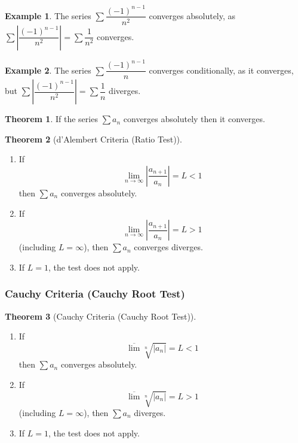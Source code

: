 \documentclass[fleqn, a4paper, 12pt, twoside]{article}
\theoremstyle{definition}
\newtheorem{example}{Example}
\theoremstyle{theorem}
\newtheorem{theorem}{Theorem}
\begin{document}
{\begin{example}
	The series $\sum \dfrac{(-1)^{n - 1}}{n^2}$ converges absolutely, as $\sum \left| \dfrac{(-1)^{n - 1}}{n^2} \right| = \sum \dfrac{1}{n^2}$ converges.
\end{example}

\begin{example}
	The series $\sum \dfrac{(-1)^{n - 1}}{n}$ converges conditionally, as it converges, but $\sum \left| \dfrac{(-1)^{n - 1}}{n^2} \right| = \sum \dfrac{1}{n}$ diverges.
\end{example}

\begin{theorem}
	If the series $\sum a_n$ converges absolutely then it converges.
\end{theorem}

\begin{theorem}[d'Alembert Criteria (Ratio Test)]
	\begin{enumerate}
		\item 
			If 
			\begin{equation*}
				\lim\limits_{n \to \infty} \left| \dfrac{a_{n + 1}}{a_n} \right| = L < 1
			\end{equation*}
			then $\sum a_n$ converges absolutely.
		\item 
			If 
			\begin{equation*}
				\lim\limits_{n \to \infty} \left| \dfrac{a_{n + 1}}{a_n} \right| = L > 1
			\end{equation*}
			(including $L = \infty$), then $\sum a_n$ converges diverges.
		\item If $L = 1$, the test does not apply.
	\end{enumerate}
	\label{d'Alembert Criteria (Ratio Test)}
\end{theorem}

\subsubsection{Cauchy Criteria (Cauchy Root Test)}

\begin{theorem}[Cauchy Criteria (Cauchy Root Test)]
	\begin{enumerate}
		\item
			If 
			\begin{equation*}
				\overline{\lim} \sqrt[n]{|a_n|} = L < 1
			\end{equation*}
			then $\sum a_n$ converges absolutely.
		\item
			If 
			\begin{equation*}
				\overline{\lim} \sqrt[n]{|a_n|} = L > 1
			\end{equation*}
			(including $L = \infty$), then $\sum a_n$ diverges.
		\item If $L = 1$, the test does not apply.
	\end{enumerate}
	\label{Cauchy Criteria (Cauchy Root Test)}
\end{theorem}

}
\end{document}
